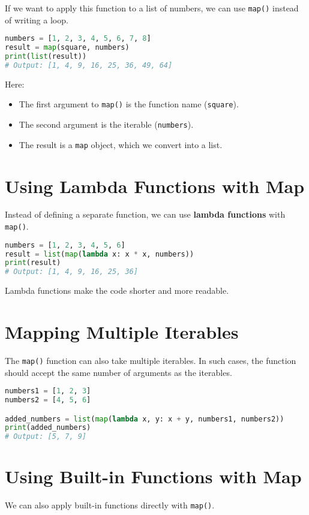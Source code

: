 If we want to apply this function to a list of numbers, we can use \texttt{map()} instead of writing a loop.

\begin{lstlisting}[language=Python, caption={Using map with a defined function}]
numbers = [1, 2, 3, 4, 5, 6, 7, 8]
result = map(square, numbers)
print(list(result))  
# Output: [1, 4, 9, 16, 25, 36, 49, 64]
\end{lstlisting}

Here:
\begin{itemize}
    \item The first argument to \texttt{map()} is the function name (\texttt{square}).
    \item The second argument is the iterable (\texttt{numbers}).
    \item The result is a \texttt{map} object, which we convert into a list.
\end{itemize}

\section{Using Lambda Functions with Map}
Instead of defining a separate function, we can use \textbf{lambda functions} with \texttt{map()}.

\begin{lstlisting}[language=Python, caption={Using map with a lambda function}]
numbers = [1, 2, 3, 4, 5, 6]
result = list(map(lambda x: x * x, numbers))
print(result)
# Output: [1, 4, 9, 16, 25, 36]
\end{lstlisting}

Lambda functions make the code shorter and more readable.

\section{Mapping Multiple Iterables}
The \texttt{map()} function can also take multiple iterables.  
In such cases, the function should accept the same number of arguments as the iterables.

\begin{lstlisting}[language=Python, caption={Adding two lists using map}]
numbers1 = [1, 2, 3]
numbers2 = [4, 5, 6]

added_numbers = list(map(lambda x, y: x + y, numbers1, numbers2))
print(added_numbers)
# Output: [5, 7, 9]
\end{lstlisting}

\section{Using Built-in Functions with Map}
We can also apply built-in functions directly with \texttt{map()}.

